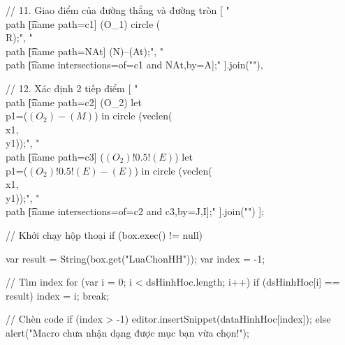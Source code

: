 // 11. Giao điểm của đường thẳng và đường tròn
[
"\t\\path \t[name path=c1] (O_1) circle (\\R);",
"\t\\path \t[name path=NAt] (N)--(At);",
"\t\\path \t[name intersections={of=c1 and NAt,by={A}}];"
].join("\n"),

// 12. Xác định 2 tiếp điểm
[
"\t\\path \t[name path=c2] (O_2)  let\\p1=($(O_2)-(M)$) in circle ({veclen(\\x1,\\y1)});",
"\t\\path \t[name path=c3] ($(O_2)!0.5!(E)$) let\\p1=($(O_2)!0.5!(E)-(E)$) in circle ({veclen(\\x1,\\y1)});",
"\t\\path \t[name intersections={of=c2 and c3,by={J,I}}];"
].join("\n")
];

// Khởi chạy hộp thoại
if (box.exec() != null) {
	var result = String(box.get("LuaChonHH"));
	var index = -1;
	
	// Tìm index
	for (var i = 0; i < dsHinhHoc.length; i++) {
		if (dsHinhHoc[i] == result) {
			index = i;
			break;
		}
	}
	
	// Chèn code
	if (index > -1) {
		editor.insertSnippet(dataHinhHoc[index]);
	} else {
		alert("Macro chưa nhận dạng được mục bạn vừa chọn!");
	}
}